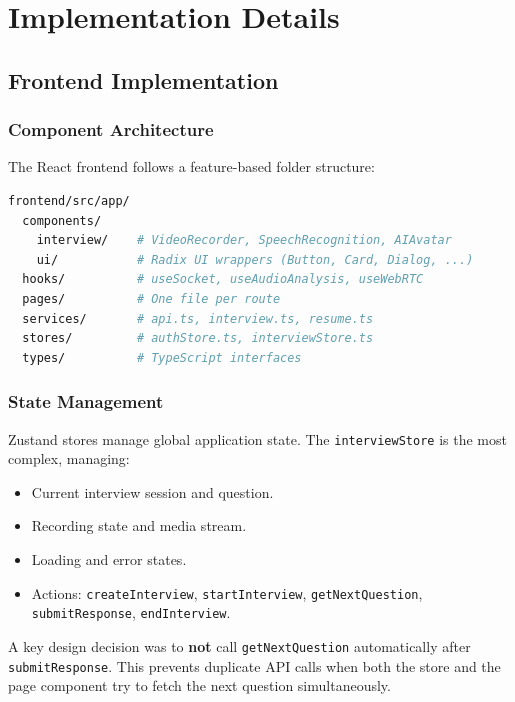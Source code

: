\chapter{Implementation Details}

\section{Frontend Implementation}

\subsection{Component Architecture}

The React frontend follows a feature-based folder structure:

\begin{lstlisting}[language=bash, caption={Frontend Folder Structure}]
frontend/src/app/
  components/
    interview/    # VideoRecorder, SpeechRecognition, AIAvatar
    ui/           # Radix UI wrappers (Button, Card, Dialog, ...)
  hooks/          # useSocket, useAudioAnalysis, useWebRTC
  pages/          # One file per route
  services/       # api.ts, interview.ts, resume.ts
  stores/         # authStore.ts, interviewStore.ts
  types/          # TypeScript interfaces
\end{lstlisting}

\subsection{State Management}

Zustand stores manage global application state. The \texttt{interviewStore} is the most complex, managing:
\begin{itemize}
    \item Current interview session and question.
    \item Recording state and media stream.
    \item Loading and error states.
    \item Actions: \texttt{createInterview}, \texttt{startInterview}, \texttt{getNextQuestion}, \texttt{submitResponse}, \texttt{endInterview}.
\end{itemize}

A key design decision was to \textbf{not} call \texttt{getNextQuestion} automatically after \texttt{submitResponse}. This prevents duplicate API calls when both the store and the page component try to fetch the next question simultaneously.

